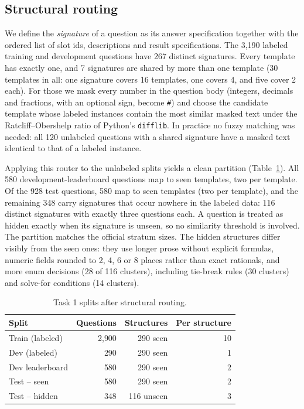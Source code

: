 \documentclass[conference]{IEEEtran}
\begin{document}
\subsection{Structural routing}
We define the \emph{signature} of a question as its answer specification together with the ordered list of slot ids,
descriptions and result specifications. The 3{,}190 labeled training and development questions have 267 distinct
signatures. Every template has exactly one, and 7 signatures are shared by more than one template (30 templates in all:
one signature covers 16 templates, one covers 4, and five cover 2 each). For those we mask every number in the question
body (integers, decimals and fractions, with an optional sign, become \texttt{\#}) and choose the candidate template
whose labeled instances contain the most similar masked text under the Ratcliff--Obershelp ratio of Python's
\texttt{difflib}. In practice no fuzzy matching was needed: all 120 unlabeled questions with a shared signature have a
masked text identical to that of a labeled instance.

Applying this router to the unlabeled splits yields a clean partition (Table~\ref{tab:splits}). All 580
development-leaderboard questions map to seen templates, two per template. Of the 928 test questions, 580 map to seen
templates (two per template), and the remaining 348 carry signatures that occur nowhere in the labeled data: 116
distinct signatures with exactly three questions each. A question is treated as hidden exactly when its signature is
unseen, so no similarity threshold is involved. The partition matches the official stratum sizes. The hidden structures
differ visibly from the seen ones: they
use longer prose without explicit formulas, numeric fields rounded to 2, 4, 6 or 8 places rather than exact
rationals, and more enum decisions (28 of 116 clusters), including tie-break rules (30 clusters) and solve-for
conditions (14 clusters).

\begin{table}[t]
\centering
\caption{Task 1 splits after structural routing.}
\label{tab:splits}
\begin{tabular}{lrrr}
\toprule
Split & Questions & Structures & Per structure \\
\midrule
Train (labeled) & 2{,}900 & 290 seen & 10 \\
Dev (labeled) & 290 & 290 seen & 1 \\
Dev leaderboard & 580 & 290 seen & 2 \\
Test -- seen & 580 & 290 seen & 2 \\
Test -- hidden & 348 & 116 unseen & 3 \\
\bottomrule
\end{tabular}
\end{table}
\end{document}
